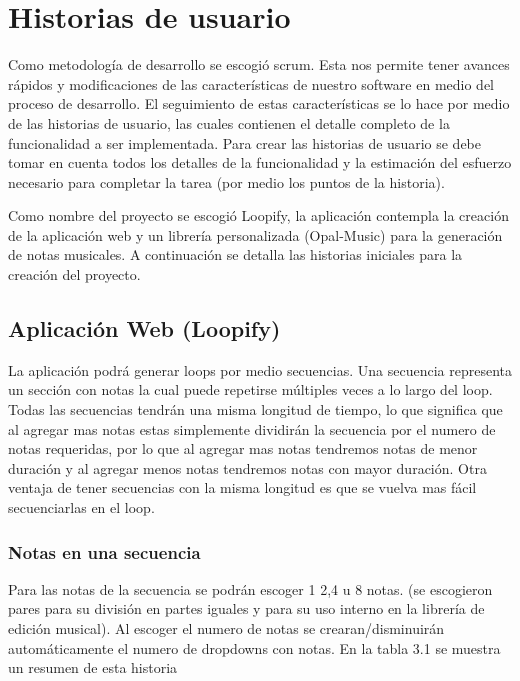 \section{Historias de usuario}

Como metodología de desarrollo se escogió scrum. Esta nos permite tener avances
rápidos y modificaciones de las características de nuestro software en medio
del proceso de desarrollo. El seguimiento de estas características se lo hace
por medio de las historias de usuario, las cuales contienen el detalle
completo de la funcionalidad a ser implementada. Para crear las historias
de usuario se debe tomar en cuenta todos los detalles de la funcionalidad
y la estimación del esfuerzo necesario para completar la tarea (por medio
los puntos de la historia).

Como nombre del proyecto se escogió Loopify, la aplicación contempla
la creación de la aplicación web y un librería personalizada (Opal-Music) para
la generación de notas musicales. A continuación se detalla las historias
iniciales para la creación del proyecto.

\subsection{Aplicación Web (Loopify)}

La aplicación podrá generar loops por medio secuencias. Una secuencia representa
un sección con notas la cual puede repetirse múltiples veces a lo largo del loop.
Todas las secuencias tendrán una misma longitud de tiempo, lo que significa que
al agregar mas notas estas simplemente dividirán la secuencia por el numero de
notas requeridas, por lo que al agregar mas notas tendremos notas
de menor duración y al agregar menos notas tendremos notas con mayor duración.
Otra ventaja de tener secuencias con la misma longitud es que se vuelva mas
fácil secuenciarlas en el loop.

\subsubsection{Notas en una secuencia}

Para las notas de la secuencia se podrán escoger 1 2,4 u 8 notas.
(se escogieron pares para su división en partes iguales y para su uso interno
en la librería de edición musical). Al escoger el numero de notas se
crearan/disminuirán automáticamente el numero de dropdowns con notas.
En la tabla 3.1 se muestra un resumen de esta historia

